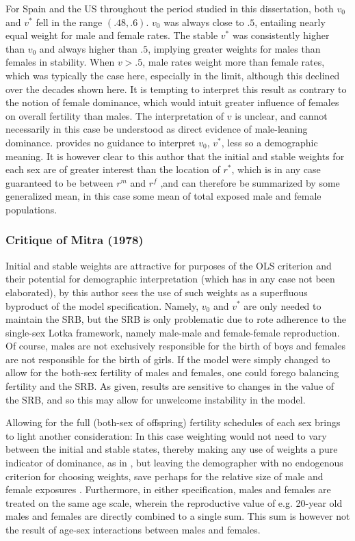 For Spain and the US throughout the period studied in this dissertation, both
$v_0$ and $v^\ast$ fell in the range $(.48,.6)$. $v_0$ was always
close to $.5$, entailing nearly equal weight for male and female rates.
The stable $v^\ast$ was consistently higher than $v_0$ and always higher than
$.5$, implying greater weights for males than females in stability. When $v > .5$, male rates weight
more than female rates, which was typically the case here, especially in the
limit, although this declined over the decades shown here. It is
tempting to interpret this result as contrary to the notion of female dominance,
which would intuit greater influence of females on overall fertility than
males. The interpretation of $v$ is unclear, and cannot necessarily in this case
be understood as direct evidence of male-leaning dominance.
\citet{mitra1978derivation} provides no guidance to interpret $v_0$, $v^\ast$,
less so a demographic meaning. It is however clear to this author that
the initial and stable weights for each sex are of greater interest
than the location of $r^\ast$, which is in any case guaranteed to be between
$r^m$ and $r^f$ ,and can therefore be summarized by some generalized mean, in
this case some mean of total exposed male and female populations.

\subsubsection{Critique of Mitra (1978)}
Initial and stable weights are attractive for purposes of the OLS
criterion and their potential for demographic interpretation (which has in any
case not been elaborated), by this author sees the use of such weights as
a superfluous byproduct of the model specification. Namely, $v_0$ and $v^\ast$
are only needed to maintain the SRB, but the SRB is only problematic due to
rote adherence to the single-sex Lotka framework, namely male-male and
female-female reproduction. Of course, males are not exclusively responsible for
the birth of boys and females are not responsible for the birth of girls. If the
model were simply changed to allow for the both-sex fertility of males and
females, one could forego balancing fertility and the SRB. As given, results are
sensitive to changes in the value of the SRB, and so this may allow for
unwelcome instability in the model.

Allowing for the full (both-sex of offspring) fertility schedules of each sex
brings to light another consideration: In this case weighting would not need to
vary between the initial and stable states, thereby making any use of weights a pure
indicator of dominance, as in \citet{goodman1967age}, but leaving the
demographer with no endogenous criterion for choosing weights, save perhaps for
the relative size of male and female exposures \citep{mitra1976effect}.
Furthermore, in either specification, males and females are treated on the same age scale, wherein the reproductive value of e.g. 20-year old males and females are
directly combined to a single sum. This sum is however not the result of age-sex
interactions between males and females.

